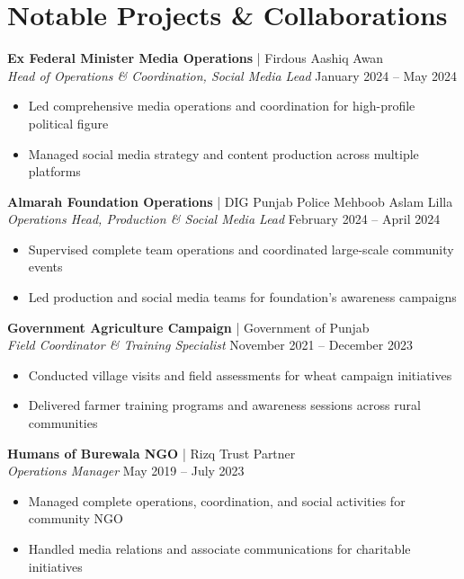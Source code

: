 \documentclass[10pt]{article}
\begin{document}
\section{Notable Projects \& Collaborations}
\textbf{Ex Federal Minister Media Operations} | Firdous Aashiq Awan \\
\textit{Head of Operations \& Coordination, Social Media Lead} \hfill January 2024 – May 2024
\begin{itemize}
\item Led comprehensive media operations and coordination for high-profile political figure
\item Managed social media strategy and content production across multiple platforms
\end{itemize}
\textbf{Almarah Foundation Operations} | DIG Punjab Police Mehboob Aslam Lilla \\
\textit{Operations Head, Production \& Social Media Lead} \hfill February 2024 – April 2024
\begin{itemize}
\item Supervised complete team operations and coordinated large-scale community events
\item Led production and social media teams for foundation's awareness campaigns
\end{itemize}
\textbf{Government Agriculture Campaign} | Government of Punjab \\
\textit{Field Coordinator \& Training Specialist} \hfill November 2021 – December 2023
\begin{itemize}
\item Conducted village visits and field assessments for wheat campaign initiatives
\item Delivered farmer training programs and awareness sessions across rural communities
\end{itemize}
\textbf{Humans of Burewala NGO} | Rizq Trust Partner \\
\textit{Operations Manager} \hfill May 2019 – July 2023
\begin{itemize}
\item Managed complete operations, coordination, and social activities for community NGO
\item Handled media relations and associate communications for charitable initiatives
\end{itemize}

\end{document}
